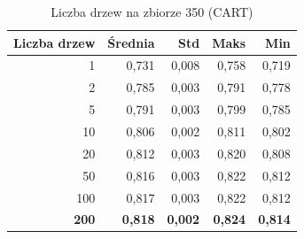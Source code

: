 \begin{table}[htbp]
\centering
\small
\setlength{\tabcolsep}{6pt}
\renewcommand{\arraystretch}{1.2}
\caption{Liczba drzew na zbiorze 350 (CART)}
\label{tab:CART_tree_count_350}
\begin{tabular}{r|r|r|r|r}
\toprule
Liczba drzew & Średnia & Std & Maks & Min \\
\hline
1 & 0,731 & 0,008 & 0,758 & 0,719 \\
2 & 0,785 & 0,003 & 0,791 & 0,778 \\
5 & 0,791 & 0,003 & 0,799 & 0,785 \\
10 & 0,806 & 0,002 & 0,811 & 0,802 \\
20 & 0,812 & 0,003 & 0,820 & 0,808 \\
50 & 0,816 & 0,003 & 0,822 & 0,812 \\
100 & 0,817 & 0,003 & 0,822 & 0,812 \\
\textbf{200} & \textbf{0,818} & \textbf{0,002} & \textbf{0,824} & \textbf{0,814} \\
\bottomrule
\end{tabular}
\end{table}